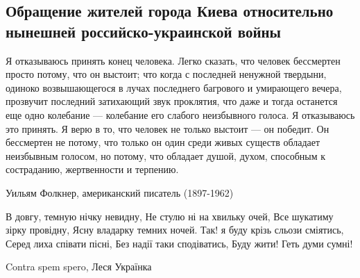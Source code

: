  
 
 
 
 

\subsection{Обращение жителей города Киева относительно нынешней российско-украинской войны}

\begin{zzquote}
Я отказываюсь принять конец человека. Легко сказать, что человек бессмертен
просто потому, что он выстоит; что когда с последней ненужной твердыни, одиноко
возвышающегося в лучах последнего багрового и умирающего вечера, прозвучит
последний затихающий звук проклятия, что даже и тогда останется еще одно
колебание — колебание его слабого неизбывного голоса. Я отказываюсь это
принять. Я верю в то, что человек не только выстоит — он победит. Он бессмертен
не потому, что только он один среди живых существ обладает неизбывным голосом,
но потому, что обладает душой, духом, способным к состраданию, жертвенности и
терпению.

Уильям Фолкнер, американский писатель (1897-1962)

В довгу, темную нічку невидну, Не стулю ні на хвильку очей,
Все шукатиму зірку провідну, Ясну владарку темних ночей.
Так! я буду крізь сльози сміятись, Серед лиха співати пісні,
Без надії таки сподіватись, Буду жити! Геть думи сумні! 

Contra spem spero, Леся Українка
\end{zzquote}


